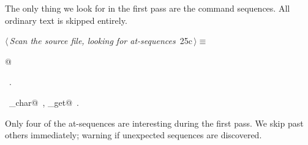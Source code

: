\documentclass[a4paper]{report}
\begin{document}
The only thing we look for in the first pass are the command
sequences. All ordinary text is skipped entirely.
\begin{flushleft} \small
\begin{minipage}{\linewidth}\label{scrap38}\raggedright\small
{} $\langle\,${\it Scan the source file, looking for at-sequences}\nobreak\ {\footnotesize {25c}}$\,\rangle\equiv$
\vspace{-1ex}
\begin{list}{}{} \item
\mbox{}@{\NWsep}
\end{list}
\vspace{-1.5ex}
\footnotesize
\begin{list}{}{\setlength{\itemsep}{-\parsep}\setlength{\itemindent}{-\leftmargin}}
\item \NWtxtMacroRefIn\ .
\item \NWtxtIdentsUsed\nobreak\  \verb@nw_char@\nobreak\ , \verb@source_get@\nobreak\ .
\item{}
\end{list}
\end{minipage}\vspace{4ex}
\end{flushleft}
Only four of the at-sequences are interesting during the first pass.
We skip past others immediately; warning if unexpected sequences are
discovered.
\end{document}
